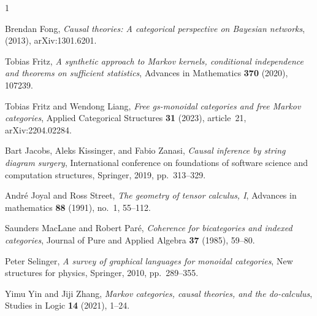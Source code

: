 \documentclass[12pt]{amsart}
\theoremstyle{plain}
\theoremstyle{definition}
\theoremstyle{remark}
\numberwithin{equation}{section}
\theoremstyle{plain}
\newcommand{\0}{\emptyset}
\begin{document}
\providecommand{\bysame}{\leavevmode\hbox to3em{\hrulefill}\thinspace}
\providecommand{\MR}{\relax\ifhmode\unskip\space\fi MR }
\providecommand{\MRhref}[2]{%
  \href{http://www.ams.org/mathscinet-getitem?mr=#1}{#2}
}
\providecommand{\href}[2]{#2}
\begin{thebibliography}{1}

Brendan Fong, \emph{Causal theories: {A} categorical perspective on {B}ayesian
  networks},  (2013), arXiv:1301.6201.

Tobias Fritz, \emph{A synthetic approach to {M}arkov kernels, conditional
  independence and theorems on sufficient statistics}, Advances in Mathematics
  \textbf{370} (2020), 107239.

Tobias Fritz and Wendong Liang, \emph{Free gs-monoidal categories and free
  {M}arkov categories}, Applied Categorical Structures \textbf{31} (2023),
  article~21, arXiv:2204.02284.

Bart Jacobs, Aleks Kissinger, and Fabio Zanasi, \emph{Causal inference by
  string diagram surgery}, International conference on foundations of software
  science and computation structures, Springer, 2019, pp.~313--329.

Andr{\'e} Joyal and Ross Street, \emph{The geometry of tensor calculus, {I}},
  Advances in mathematics \textbf{88} (1991), no.~1, 55--112.

Saunders MacLane and Robert Par{\'e}, \emph{Coherence for bicategories and
  indexed categories}, Journal of Pure and Applied Algebra \textbf{37} (1985),
  59--80.

Peter Selinger, \emph{A survey of graphical languages for monoidal categories},
  New structures for physics, Springer, 2010, pp.~289--355.

Yimu Yin and Jiji Zhang, \emph{{M}arkov categories, causal theories, and the
  do-calculus}, Studies in Logic \textbf{14} (2021), 1--24.

\end{thebibliography}
\end{document}
